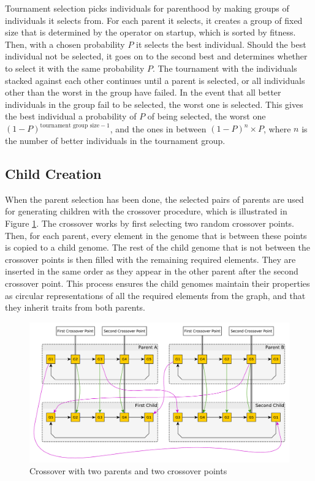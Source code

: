 Tournament selection picks individuals for parenthood by making groups of individuals it selects from. For each parent it selects, it creates a group of fixed size that is determined by the operator on startup, which is sorted by fitness. Then, with a chosen probability $P$ it selects the best individual. Should the best individual not be selected, it goes on to the second best and determines whether to select it with the same probability $P$. The tournament with the individuals stacked against each other continues until a parent is selected, or all individuals other than the worst in the group have failed. In the event that all better individuals in the group fail to be selected, the worst one is selected. This gives the best individual a probability of $P$ of being selected, the worst one $(1-P)^{\text{tournament group size}-1}$, and the ones in between $(1-P)^{n} \times P$, where $n$ is the number of better individuals in the tournament group.


\subsection{Child Creation} %
\label{sub:achitecture_child_creation}

When the parent selection has been done, the selected pairs of parents are used for generating children with the crossover procedure, which is illustrated in Figure \ref{fig:crossover_illustration}. The crossover works by first selecting two random crossover points. Then, for each parent, every element in the genome that is between these points is copied to a child genome. The rest of the child genome that is not between the crossover points is then filled with the remaining required elements. They are inserted in the same order as they appear in the other parent after the second crossover point. This process ensures the child genomes maintain their properties as circular representations of all the required elements from the graph, and that they inherit traits from both parents.

\begin{figure}[thbp]
    \centerline{\includegraphics[width=\textwidth]{figures/Architecture/Crossover_Illustration.pdf}}
    \caption{Crossover with two parents and two crossover points}
    \label{fig:crossover_illustration}
\end{figure}

